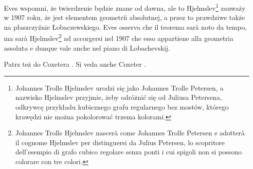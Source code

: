 Eves \cite[s. 311]{eves1_1972} wspomni, że twierdzenie będzie znane od dawna, ale to Hjelmslev\footnote{Johannes Trolle Hjelmslev urodzi się jako Johannes Trolle Petersen, a nazwisko Hjelmslev przyjmie, żeby odróżnić się od Juliusa Petersena, odkrywcę przykładu kubicznego grafu regularnego bez mostów, którego krawędzi nie można pokolorować trzema kolorami.} zauważy w 1907 roku, że jest elementem geometrii absolutnej, a przez to prawdziwe także na płaszczyźnie Łobaczewskiego. %
Eves \cite[p.~311]{eves1_1972} osserva che il teorema sarà noto da tempo, ma sarà Hjelmslev\footnote{Johannes Trolle Hjelmslev nascerà come Johannes Trolle Petersen e adotterà il cognome Hjelmslev per distinguersi da Julius Petersen, lo scopritore dell'esempio di grafo cubico regolare senza ponti i cui spigoli non si possono colorare con tre colori.} ad accorgersi nel 1907 che esso appartiene alla geometria assoluta e dunque vale anche nel piano di Lobachevskij. %



Patrz też do Coxetera \cite[s. 63, 64]{coxeter_1967}. %
Si veda anche Coxeter \cite[pp.~63--64]{coxeter_1967}. %











%